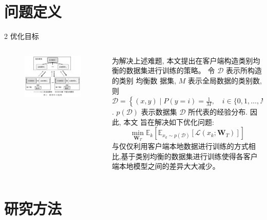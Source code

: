 \documentclass{sintefbeamer}
\theoremstyle{definition}
\begin{document}
\section{问题定义}

\begin{frame}{2 优化目标}

\begin{columns}
\begin{column}{0.4\textwidth}
\begin{figure}[ht]
\centering
\includegraphics[width=1\textwidth]{images/img_fl}
\end{figure}
\end{column}
\begin{column}{0.6\textwidth}
为解决上述难题, 本文提出在客户端构造类别均衡的数据集进行训练的策略。 令 $\mathcal{D}$ 表示所构造的类别 均衡数 据集, $M$ 表示全局数据的类别数,则 $\mathcal{D}=\left\{(x, y) \mid P(y=i)=\frac{1}{M}, \quad i \in\{0,1, \ldots, M-1\}\right.$.
$p(\mathcal{D})$ 表示数据集 $\mathcal{D}$ 所代表的经验分布. 因此, 本文 旨在解决如下优化问题:
$$
\min _{\boldsymbol{W}_T} \mathbb{E}_k\left[\mathbb{E}_{x_k \sim p(\mathcal{D})}\left[\mathcal{L}\left(x_k ; \boldsymbol{W}_T\right)\right]\right]
$$
与仅仅利用客户端本地数据进行训练的方式相比,基于类别均衡的数据集进行训练使得各客户端本地模型之间的差异大大减少。
\end{column}
\end{columns}


\end{frame}

\section{研究方法}
\end{document}
